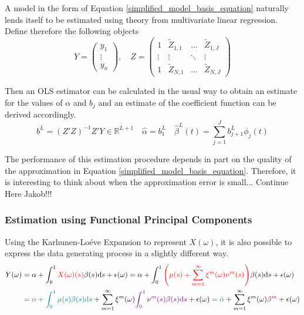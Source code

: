 \documentclass[11pt,twoside,a4paper]{article}
\begin{document}
	A model in the form of Equation \ref{simplified_model_basis_equation} naturally lends itself to be estimated using theory from multivariate linear regression. Define therefore the following objects
	\begin{equation}\label{regressor_mat_1}
		Y = \begin{pmatrix}
			y_1 \\ \vdots \\ y_n
		\end{pmatrix}, \quad
		Z = \begin{pmatrix}
			1 & \tilde{Z}_{1,1} & \dots & \tilde{Z}_{1,J} \\
			\vdots & \vdots & \ddots & \vdots \\
			1 & \tilde{Z}_{N,1} & \dots & \tilde{Z}_{N,J}
		\end{pmatrix}
	\end{equation}
	
	Then an OLS estimator can be calculated in the usual way to obtain an estimate for the values of $\alpha$ and $b_j$ and an estimate of the coefficient function can be derived accordingly.
	\begin{equation}
		b^L = \left(Z'Z\right)^{-1}Z'Y \in \mathbb{R}^{L+1} \quad \hat{\alpha} = b_{1}^{L} \quad \hat{\beta}^L(t) = \sum_{j = 1}^{J} b_{j+1}^L \phi_j(t)
	\end{equation}

	The performance of this estimation procedure depends in part on the quality of the approximation in Equation \ref{simplified_model_basis_equation}. Therefore, it is interesting to think about when the approximation error is small... {\color{red}Continue Here Jakob!!!}
	
	\subsubsection{Estimation using Functional Principal Components}\label{fpc_exp_transf}
	
	Using the Karhunen-Lo\'{e}ve Expansion to represent $X(\omega)$, it is also possible to express the data generating process in a slightly different way.
	\begin{equation}
		\begin{split}
			Y(\omega) &= \alpha + \int_{0}^{1} {\color{red}X(\omega)(s)} \beta(s) \mathrm{d}s + \epsilon(\omega)
			= \alpha + \int_{0}^{1} {\color{red}\left(\mu(s) + \sum_{m = 1}^{\infty} \xi^m(\omega) \nu^m(s)\right)} \beta(s) \mathrm{d}s + \epsilon(\omega)\\
			&= {\color{teal}\alpha + \int_{0}^{1} \mu(s) \beta(s) \mathrm{d}s} + \sum_{m = 1}^{\infty} \xi^m(\omega) {\color{violet}\int_{0}^{1} \nu^m(s) \beta(s) \mathrm{d}s} + \epsilon(\omega)
			= {\color{teal}\bar{\alpha}} + \sum_{m = 1}^{\infty} \xi^m(\omega) {\color{violet}\beta^m} + \epsilon(\omega)
		\end{split}
	\end{equation}
\end{document}
